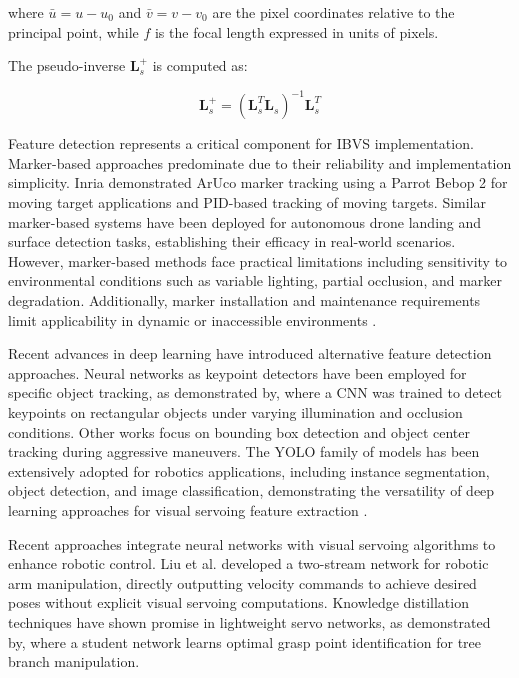 \documentclass[10pt,twocolumn,letterpaper]{article}
\begin{document}
where $\bar{u} = u - u_0$ and $\bar{v} = v - v_0$ are the pixel coordinates relative to the principal point, while $f$ is the focal length expressed in units of pixels.

The pseudo-inverse $\mathbf{L}_s^+$ is computed as:

\begin{equation}
\mathbf{L}_s^+ = (\mathbf{L}_s^T \mathbf{L}_s)^{-1} \mathbf{L}_s^T
\end{equation}

Feature detection represents a critical component for IBVS implementation. Marker-based approaches predominate due to their reliability and implementation simplicity. Inria demonstrated ArUco marker tracking using a Parrot Bebop 2 for moving target applications\cite{Marchand05b} and PID-based tracking of moving targets\cite{teuliere2011chasing}. Similar marker-based systems have been deployed for autonomous drone landing and surface detection tasks\cite{keipour2022visual, drones8110605}, establishing their efficacy in real-world scenarios.
However, marker-based methods face practical limitations including sensitivity to environmental conditions such as variable lighting, partial occlusion, and marker degradation. Additionally, marker installation and maintenance requirements limit applicability in dynamic or inaccessible environments \cite{liang2020moving}.

Recent advances in deep learning have introduced alternative feature detection approaches. Neural networks as keypoint detectors have been employed for specific object tracking, as demonstrated by\cite{sepahvand2025deep}, where a CNN was trained to detect keypoints on rectangular objects under varying illumination and occlusion conditions. Other works focus on bounding box detection and object center tracking during aggressive maneuvers\cite{10140151}.
The YOLO family of models has been extensively adopted for robotics applications\cite{li2023design, zhang2024vision}, including instance segmentation\cite{mohamed2021insta, tang2024visual}, object detection\cite{drones8110605}, and image classification\cite{zhao2024real}, demonstrating the versatility of deep learning approaches for visual servoing feature extraction \cite{pathre2024imagine2servo}.

Recent approaches integrate neural networks with visual servoing algorithms to enhance robotic control. Liu et al.\cite{liu2019image} developed a two-stream network for robotic arm manipulation, directly outputting velocity commands to achieve desired poses without explicit visual servoing computations. Knowledge distillation techniques have shown promise in lightweight servo networks, as demonstrated by\cite{drones8110605}, where a student network learns optimal grasp point identification for tree branch manipulation.
\end{document}
